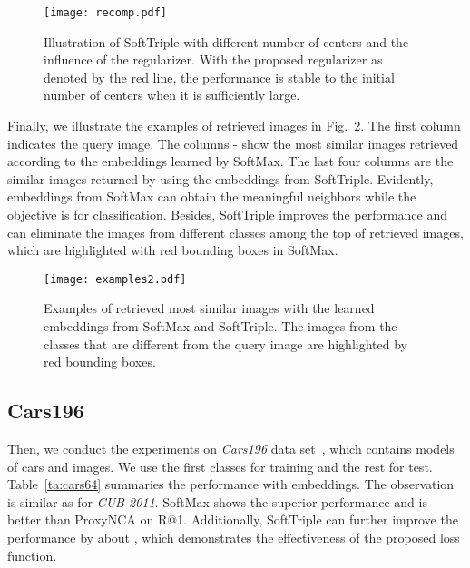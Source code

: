 \documentclass[10pt,twocolumn,letterpaper]{article}
\begin{document}
\begin{figure}[!ht]
\centering
\texttt{[image: recomp.pdf]}
\caption{Illustration of SoftTriple with different number of centers and the influence of the regularizer. With the proposed regularizer as denoted by the red line, the performance is stable to the initial number of centers  when it is sufficiently large.\label{fig:recall}}
\end{figure}

Finally, we illustrate the examples of retrieved images in Fig.~\ref{fig:exa}. The first column indicates the query image. The columns - show the most similar images retrieved according to the embeddings learned by SoftMax. The last four columns are the similar images returned by using the embeddings from SoftTriple. Evidently, embeddings from SoftMax can obtain the meaningful neighbors while the objective is for classification. Besides, SoftTriple improves the performance and can eliminate the images from different classes among the top of retrieved images, which are highlighted with red bounding boxes in SoftMax.

\begin{figure}[!ht]
\centering
\texttt{[image: examples2.pdf]}
\caption{Examples of retrieved most similar images with the learned embeddings from SoftMax and SoftTriple. The images from the classes that are different from the query image are highlighted by red bounding boxes.}\label{fig:exa}
\end{figure}

\subsection{Cars196}

Then, we conduct the experiments on \textit{Cars196} data set~\cite{3DRR2013}, which contains  models of cars and  images. We use the first  classes for training and the rest for test. Table~\ref{ta:cars64} summaries the performance with  embeddings. The observation is similar as for \textit{CUB-2011}. SoftMax shows the superior performance and is  better than ProxyNCA on R@1. Additionally, SoftTriple can further improve the performance by about , which demonstrates the effectiveness of the proposed loss function.
\end{document}
